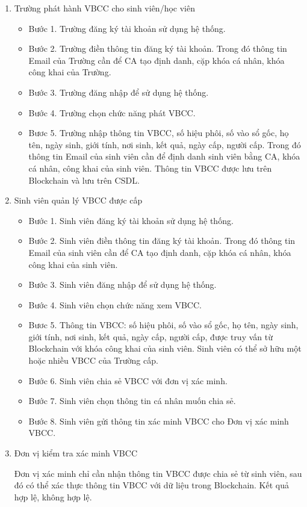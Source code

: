 \begin{enumerate}
\item Trường phát hành VBCC cho sinh viên/học viên

	\begin{itemize}
		\item 
	Bước 1. Trường đăng ký tài khoản sử dụng hệ thống.
\item 
		Bước 2. Trường điền thông tin đăng ký tài khoản.
		Trong đó thông tin Email của Trường cần để CA tạo định danh, cặp khóa cá nhân, khóa công khai của Trường.
	\item
		Bước 3. Trường đăng nhập để sử dụng hệ thống.
	\item 
		Bước 4. Trường chọn chức năng phát VBCC.
	\item
		Bươc 5. Trường nhập thông tin VBCC, số hiệu phôi, số vào sổ gốc, họ tên, ngày sinh, giới tính, nơi sinh, kết quả, ngày cấp, người cấp.
		Trong đó thông tin Email của sinh viên cần để định danh sinh viên bằng CA, khóa cá nhân, công khai của sinh viên. Thông tin VBCC được lưu trên Blockchain và lưu trên CSDL.
	\end{itemize}
\item Sinh viên quản lý VBCC được cấp

	\begin{itemize}
		\item 
	Bước 1. Sinh viên đăng ký tài khoản sử dụng hệ thống.
\item 
		Bước 2. Sinh viên điền thông tin đăng ký tài khoản.
		Trong đó thông tin Email của sinh viên cần để CA tạo định danh, cặp khóa cá nhân, khóa công khai của sinh viên.
	\item
		Bước 3. Sinh viên  đăng nhập để sử dụng hệ thống.
	\item 
		Bước 4. Sinh viên chọn chức năng xem VBCC.
	\item
		Bươc 5. Thông tin VBCC: số hiệu phôi, số vào sổ gốc, họ tên, ngày sinh, giới tính, nơi sinh, kết quả, ngày cấp, người cấp, được truy vấn từ Blockchain với khóa công khai của sinh viên.
Sinh viên có thể sở hữu một hoặc nhiều VBCC của Trường cấp. 
	\item Bước 6. Sinh viên chia sẻ VBCC với đơn vị xác minh. 
	\item Bước 7. Sinh viên chọn thông tin cá nhân muốn chia sẻ.
	\item Bước 8. Sinh viên gửi thông tin xác minh VBCC cho Đơn vị xác minh VBCC.
	\end{itemize}
\item Đơn vị kiểm tra xác minh VBCC

Đơn vị xác minh chỉ cần nhận thông tin VBCC được chia sẻ từ sinh viên, sau đó có thể xác thực thông tin VBCC với dữ liệu trong Blockchain. Kết quả hợp lệ, không hợp lệ.

\end{enumerate}

